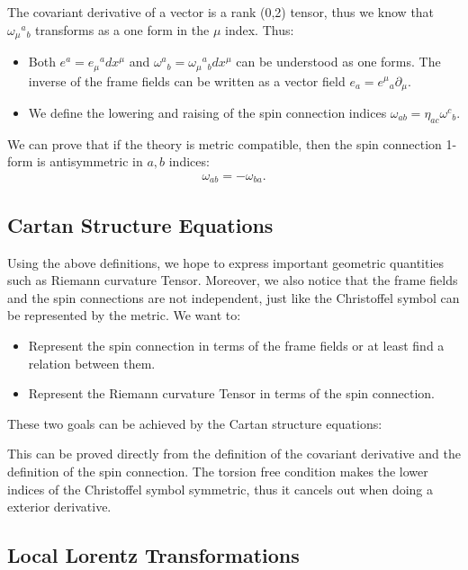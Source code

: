 The covariant derivative of a vector is a rank (0,2) tensor, thus we
know that $ \omega_\mu{}^a{}_b $ transforms as a one form in the $
\mu $ index. Thus:
\begin{itemize}
  \item Both $ e^a = e_\mu{}^a dx^\mu $ and $ \omega^a{}_b =
    \omega_\mu{}^a{}_b dx^\mu $ can be understood as one forms. The
    inverse of the frame fields can be written as a vector field $
    e_a = {e^\mu}_a \partial_\mu $.
  \item We define the lowering and raising of the spin connection
    indices $ \omega_{ab} = \eta_{ac}\omega^c{}_b $.
\end{itemize}
We can prove that if the theory is metric compatible, then the spin
connection 1-form is antisymmetric in $ a,b $ indices:
\begin{align}
  \omega_{ ab} = -\omega_{ ba}.
\end{align}

\subsection{Cartan Structure Equations}

Using the above definitions, we hope to express important geometric
quantities such as Riemann curvature Tensor. Moreover, we also notice
that the frame fields and the spin connections are not independent,
just like the Christoffel symbol can be represented by the metric. We want to:
\begin{itemize}
  \item Represent the spin connection in terms of the frame fields or
    at least find a relation between them.
  \item Represent the Riemann curvature Tensor in terms of the spin connection.
\end{itemize}
These two goals can be achieved by the Cartan structure equations:

This can be proved directly from the definition of the covariant
derivative and the definition of the spin connection. The torsion
free condition makes the lower indices of the Christoffel symbol
symmetric, thus it cancels out when doing a exterior derivative.

\subsection{Local Lorentz Transformations}

